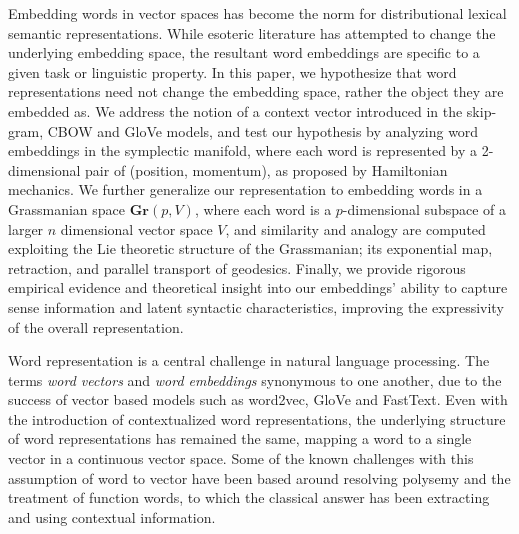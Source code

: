\documentclass[11pt]{book}
\begin{document}
Embedding words in vector spaces has become the norm for distributional
lexical semantic representations. While esoteric literature has attempted
to change the underlying embedding space, the resultant word embeddings are
specific to a given task or linguistic property. In this paper, we
hypothesize that word representations need not change the embedding space,
rather the object they are embedded as. We address the notion of a context
vector introduced in the skip-gram, CBOW and GloVe models, and test our
hypothesis by analyzing word embeddings in the symplectic manifold, where
each word is represented by a 2-dimensional pair of (position, momentum),
as proposed by Hamiltonian mechanics. We further generalize our
representation to embedding words in a Grassmanian space $\mathbf{Gr}(p, V)$,
where each word is a $p$-dimensional subspace of a larger $n$
dimensional vector space $V$, and similarity and analogy are computed
exploiting the Lie theoretic structure of the Grassmanian; its exponential
map, retraction, and parallel transport of geodesics. Finally, we provide
rigorous empirical evidence and theoretical insight into our embeddings'
ability to capture sense information and latent syntactic characteristics,
improving the expressivity of the overall representation.

Word representation is a central challenge in natural language processing. The
terms \emph{word vectors} and \emph{word embeddings} synonymous to one another,
due to the success of vector based models such as word2vec, GloVe and FastText.
Even with the introduction of contextualized word representations, the
underlying structure of word representations has remained the same, mapping a
word to a single vector in a continuous vector space. Some of the known
challenges with this assumption of word to vector have been based around
resolving polysemy and the treatment of function words, to which the classical
answer has been extracting and using contextual information. 

\end{document}

